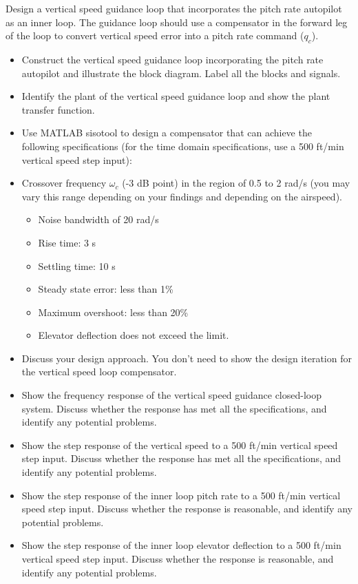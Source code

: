Design a vertical speed guidance loop that incorporates the pitch rate autopilot as an inner loop. The guidance loop should use a compensator in the forward leg of the loop to convert vertical speed error into a pitch rate command ($q_c$).
\begin{itemize}
\item Construct the vertical speed guidance loop incorporating the pitch rate autopilot and illustrate the block diagram. Label all the blocks and signals.
\item Identify the plant of the vertical speed guidance loop and show the plant transfer function.
\item Use MATLAB sisotool to design a compensator that can achieve the following specifications (for the time domain specifications, use a 500 ft/min vertical speed step input): 
\item Crossover frequency $\omega_c$ (-3 dB point) in the region of 0.5 to 2 rad/s (you may vary this range depending on your findings and depending on the airspeed).
\begin{itemize}
\item Noise bandwidth of 20 rad/s
\item Rise time: 3 s
\item Settling time: 10 s
\item Steady state error: less than 1\%
\item Maximum overshoot: less than 20\%
\item Elevator deflection does not exceed the limit.
\end{itemize}
\item Discuss your design approach. You don’t need to show the design iteration for the vertical speed loop compensator.
\item Show the frequency response of the vertical speed guidance closed-loop system. Discuss whether the response has met all the specifications, and identify any potential problems.
\item Show the step response of the vertical speed to a 500 ft/min vertical speed step input. Discuss whether the response has met all the specifications, and identify any potential problems.
\item Show the step response of the inner loop pitch rate to a 500 ft/min vertical speed step input. Discuss whether the response is reasonable, and identify any potential problems.
\item Show the step response of the inner loop elevator deflection to a 500 ft/min vertical speed step input. Discuss whether the response is reasonable, and identify any potential problems.
\end{itemize}
